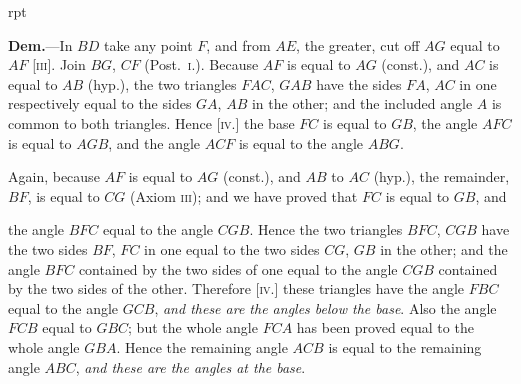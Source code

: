 \documentclass[oneside]{book}
\newcounter{wrapwidth}
\newcommand\imgflow[3]{
\setcounter{wrapwidth}{#1}

\begin{wrapfigure}[#2]{r}{\value{wrapwidth}pt}
\begin{center}
\vspace{-0.3in}

\end{center}
\end{wrapfigure}
}
\begin{document}
\imgflow{128}{12}{f016}

\textbf{Dem.}---In $BD$ take any point $F$, and from $AE$, the
greater, cut off $AG$ equal to
$AF$ [\textsc{iii}]. Join $BG$, $CF$
(Post.~\textsc{i.}). Because $AF$ is
equal to $AG$ (const.), and $AC$
is equal to $AB$ (hyp.), the
two triangles $FAC$, $GAB$
have the sides $FA$, $AC$ in
one respectively equal to the
sides $GA$, $AB$ in the other;
and the included angle $A$ is
common to both triangles.
Hence [\textsc{iv.}] the base $FC$ is
equal to $GB$, the angle $AFC$ is equal to $AGB$, and the
angle $ACF$ is equal to the angle $ABG$.

Again, because $AF$ is equal to $AG$ (const.), and $AB$
to $AC$ (hyp.), the remainder, $BF$, is equal to $CG$ (Axiom
\textsc{iii}); and we have proved that $FC$ is equal to $GB$, and

the angle $BFC$ equal to the angle $CGB$. Hence the
two triangles $BFC$, $CGB$ have the two sides $BF$, $FC$ in
one equal to the two sides $CG$, $GB$ in the other; and the
angle $BFC$ contained by the two sides of one equal to the
angle $CGB$ contained by the two sides of the other.
Therefore [\textsc{iv.}] these triangles have the angle $FBC$
equal to the angle $GCB$, \emph{and these are the angles below
the base}. Also the angle $FCB$ equal to $GBC$; but the
whole angle $FCA$ has been proved equal to the whole
angle $GBA$. Hence the remaining angle $ACB$ is equal
to the remaining angle $ABC$, \emph{and these are the angles
at the base}.
\end{document}

